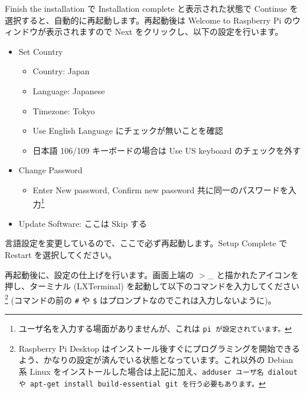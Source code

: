 \documentclass[a4j,oneside]{ujbook}
\begin{document}
Finish the installation で Installation complete と表示された状態で Continue を選択すると、自動的に再起動します。再起動後は Welcome to Raspberry Pi のウィンドウが表示されますので Next をクリックし、以下の設定を行います。

\begin{itemize}
 \item Set Country
  \begin{itemize}
   \item Country: Japan
   \item Language: Japanese
   \item Timezone: Tokyo
   \item Use English Language にチェックが無いことを確認
   \item 日本語 106/109 キーボードの場合は Use US keyboard のチェックを外す
  \end{itemize}
  \item Change Password
  \begin{itemize}
   \item Enter New password, Confirm new password 共に同一のパスワードを入力\footnote{ユーザ名を入力する場面がありませんが、これは \tt{pi} が設定されています。}
  \end{itemize}
  \item Update Software: ここは Skip する
\end{itemize}

言語設定を変更しているので、ここで必ず再起動します。Setup Complete で Restart を選択してください。

再起動後に、設定の仕上げを行います。画面上端の $>$\_ と描かれたアイコンを押し、ターミナル (LXTerminal) を起動して以下のコマンドを入力してください\footnote{Raspberry Pi Desktop はインストール後すぐにプログラミングを開始できるよう、かなりの設定が済んでいる状態となっています。これ以外の Debian 系 Linux をインストールした場合は上記に加え、\tt{adduser ユーザ名 dialout} や \tt{apt-get install build-essential git} を行う必要もあります。} (コマンドの前の \verb+#+ や \verb+$+ はプロンプトなのでこれは入力しないように)。
\end{document}
